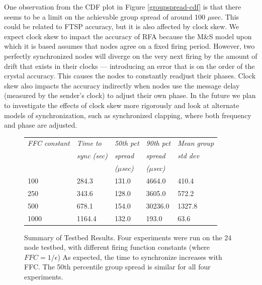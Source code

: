 One observation from the CDF plot in Figure \ref{groupspread-cdf} is
that there seems to be a limit on the achievable group spread of
around 100 $\mu$sec.  This could be related to FTSP accuracy, but it
is also affected by clock skew. We expect clock skew to impact the
accuracy of RFA because the M\&S model upon which it is based assumes
that nodes agree on a fixed firing period. However, two perfectly
synchronized nodes will diverge on the very next firing by the amount
of drift that exists in their clocks --- introducing an error that is on
the order of the crystal accuracy. This causes the nodes to constantly
readjust their phases. Clock skew also impacts the accuracy indirectly
when nodes use the message delay (measured by the sender's clock) to
adjust their own phase. In the future we plan to investigate the
effects of clock skew more rigorously and look at alternate models of
synchronization, such as synchronized clapping, where both frequency
and phase are adjusted.


\begin{figure}[t]
\begin{center}
\begin{small}
\begin{tabular}{|lllll|} \hline
{\em FFC constant} & 
{\em Time to} & 
{\em 50th pct} &
{\em 90th pct} &
{\em Mean group} \\
{\em } &
{\em sync (sec)} &
{\em spread} & 
{\em spread} & 
{\em std dev} \\
&
&
{\em ($\mu$sec)} & 
{\em ($\mu$sec)} & 
\\
\hline
100 & 284.3 & 131.0 & 4664.0 & 410.4 \\
250 & 343.6 & 128.0 & 3605.0 & 572.2 \\
500 & 678.1 & 154.0 & 30236.0 & 1327.8 \\
1000 & 1164.4 & 132.0 & 193.0 & 63.6 \\
\hline
\end{tabular}
\end{small}
\end{center}
\caption{Summary of Testbed Results. Four experiments were run on the
24 node testbed, with different firing function constants (where $FFC
= 1/\epsilon$) As expected, the time to synchronize increases with
FFC. The 50th percentile group spread is similar for all four
experiments.}
\label{motelab-summary}
\end{figure}

